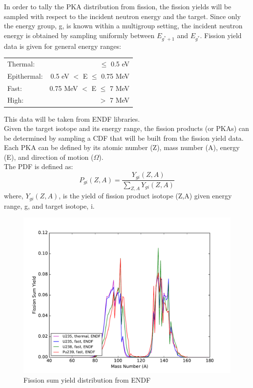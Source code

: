 \documentclass{anstrans}
\begin{document}
In order to tally the PKA distribution from fission, the fission yields
will be sampled with respect to the incident neutron energy
and the target. Since only the energy group, g, is known within a multigroup setting,
the incident neutron energy is obtained by sampling uniformly between $E_{g^*+1}$ and $E_{g^*}$.
Fission yield data is given for general energy ranges:\\

\begin{tabular}{  l  r }
  Thermal:    & $\le$ 0.5 eV \\
  Epithermal: & 0.5 eV $<$ E $\le$ 0.75 MeV \\
  Fast:       & 0.75 MeV $<$ E $\le$ 7 MeV \\
  High:       & $>$ 7 MeV \\
\end{tabular}

\vspace{0.5cm}
\noindent This data will be taken from ENDF libraries. \\

Given the target isotope and its energy range, the fission products (or PKAs)
can be determined by sampling a CDF that will be built from the fission yield data.
Each PKA can be defined by its atomic number (Z), mass number (A), energy (E),
and direction of motion ($\Omega$).\\
The PDF is defined as:
\begin{equation}
  P_{gi}(Z,A) = \frac{Y_{gi}(Z,A)}{\sum_{Z,A} Y_{gi}(Z,A)}
\end{equation}
where, $Y_{gi}(Z,A)$, is the yield of fission product isotope (Z,A) given energy range, g, and target isotope, i.

\begin{figure}[ht] %
  \centering
  \includegraphics[scale=0.4]{./figures/fission_product_yields.pdf}
  \caption{Fission sum yield distribution from ENDF}
\end{figure}
\end{document}
